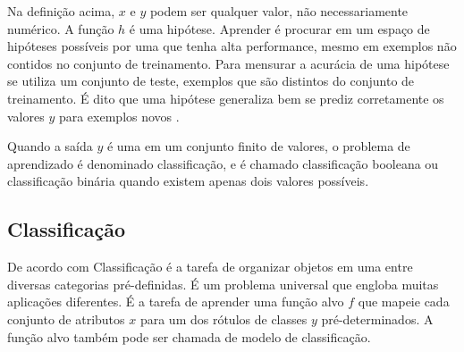 Na definição acima, \(x\) e \(y\) podem ser qualquer valor, não necessariamente
numérico. A função \(h\) é uma hipótese. Aprender é procurar em um espaço de
hipóteses possíveis por uma que tenha alta performance, mesmo em exemplos não
contidos no conjunto de treinamento. Para mensurar a acurácia de uma hipótese se
utiliza um conjunto de teste, exemplos que são distintos do conjunto de
treinamento. É dito que uma hipótese generaliza bem se prediz corretamente os
valores \(y\) para exemplos novos \cite{russell2011artificial}.

Quando a saída \(y\) é uma em um conjunto finito de valores, o problema de
aprendizado é denominado classificação, e é chamado classificação booleana ou
classificação binária quando existem apenas dois valores
possíveis\cite{russell2011artificial}.

\subsection{Classificação}

De acordo com  Classificação é a tarefa de
organizar objetos em uma entre diversas categorias pré-definidas. É um problema
universal que engloba muitas aplicações diferentes. É a tarefa de aprender uma
função alvo \(f\) que mapeie cada conjunto de atributos \(x\) para um dos
rótulos de classes \(y\) pré-determinados. A função alvo também pode ser chamada
de modelo de classificação.


